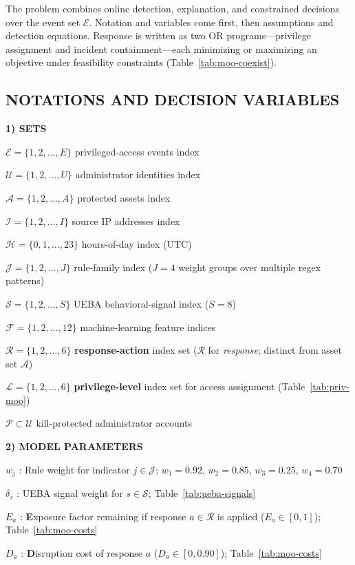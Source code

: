 \documentclass{ieeeaccess}
\begin{document}
The problem combines online detection, explanation, and constrained decisions over the event set $\mathcal{E}$. Notation and variables come first, then assumptions and detection equations. Response is written as two OR programs---privilege assignment and incident containment---each minimizing or maximizing an objective under feasibility constraints (Table~\ref{tab:moo-coexist}).

\subsection{NOTATIONS AND DECISION VARIABLES}

\textbf{1) SETS}

$\mathcal{E}=\{1,2,\ldots,E\}$ privileged-access events index

$\mathcal{U}=\{1,2,\ldots,U\}$ administrator identities index

$\mathcal{A}=\{1,2,\ldots,A\}$ protected assets index

$\mathcal{I}=\{1,2,\ldots,I\}$ source IP addresses index

$\mathcal{H}=\{0,1,\ldots,23\}$ hours-of-day index (UTC)

$\mathcal{J}=\{1,2,\ldots,J\}$ rule-family index ($J=4$ weight groups over multiple regex patterns)

$\mathcal{S}=\{1,2,\ldots,S\}$ UEBA behavioral-signal index ($S=8$)

$\mathcal{F}=\{1,2,\ldots,12\}$ machine-learning feature indices

$\mathcal{R}=\{1,2,\ldots,6\}$ \textbf{response-action} index set ($\mathcal{R}$ for \textit{response}; distinct from asset set $\mathcal{A}$)

$\mathcal{L}=\{1,2,\ldots,6\}$ \textbf{privilege-level} index set for access assignment (Table~\ref{tab:priv-moo})

$\mathcal{P}\subset\mathcal{U}$ kill-protected administrator accounts

\textbf{2) MODEL PARAMETERS}

$w_j$ : Rule weight for indicator $j\in\mathcal{J}$; $w_1=0.92$, $w_2=0.85$, $w_3=0.25$, $w_4=0.70$

$\delta_s$ : UEBA signal weight for $s\in\mathcal{S}$; Table~\ref{tab:ueba-signals}

$E_a$ : \textbf{E}xposure factor remaining if response $a\in\mathcal{R}$ is applied ($E_a\in[0,1]$); Table~\ref{tab:moo-costs}

$D_a$ : \textbf{D}isruption cost of response $a$ ($D_a\in[0,0.90]$); Table~\ref{tab:moo-costs}
\end{document}
